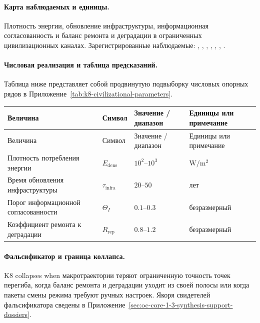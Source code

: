 \paragraph{Карта наблюдаемых и единицы.}
Плотность энергии, обновление инфраструктуры, информационная согласованность и баланс ремонта и деградации в ограниченных цивилизационных каналах.
Зарегистрированные наблюдаемые: , \allowbreak {}, \allowbreak {}, \allowbreak {}, \allowbreak {}, \allowbreak {}, \allowbreak {}.

\paragraph{Числовая реализация и таблица предсказаний.}
Таблица ниже представляет собой продвинутую подвыборку числовых опорных рядов в Приложение~\ref{tab:k8-civilizational-parameters}.
\begin{longtable}{@{}L{0.27\textwidth}L{0.15\textwidth}L{0.24\textwidth}L{0.16\textwidth}@{}}
\toprule
Величина & Символ & Значение / диапазон & Единицы или примечание \\
\midrule
\endfirsthead
\toprule
Величина & Символ & Значение / диапазон & Единицы или примечание \\
\midrule
\endhead
Плотность потребления энергии & $\scriptstyle E_{\mathrm{dens}}$ & $10^2\text{--}10^3$ & $\mathrm{W/m^2}$ \\
Время обновления инфраструктуры & $\scriptstyle \tau_{\mathrm{infra}}$ & $20\text{--}50$ & лет \\
Порог информационной согласованности & $\scriptstyle \Theta_I$ & $0.1\text{--}0.3$ & безразмерный \\
Коэффициент ремонта к деградации & $\scriptstyle R_{\mathrm{rep}}$ & $0.8\text{--}1.2$ & безразмерный \\
\bottomrule
\end{longtable}

\paragraph{Фальсификатор и граница коллапса.}
K8 collapses when макротраектории теряют ограниченную точность точек перегиба, когда баланс ремонта и деградации уходит из своей полосы или когда пакеты смены режима требуют ручных настроек.
Якоря свидетелей фальсификатора сведены в Приложение~\ref{sec:oc-core-1-3-synthesis-support-dossiers}.

